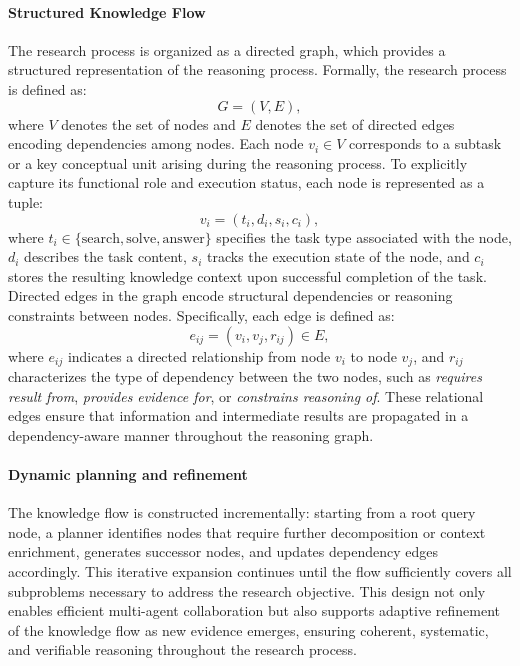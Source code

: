 \paragraph{Structured Knowledge Flow}
The research process is organized as a directed graph, which provides a structured
representation of the reasoning process. Formally, the research process is
defined as:
\begin{equation}
G = (V, E),
\end{equation}
where $V$ denotes the set of nodes and $E$ denotes the set of directed edges encoding
dependencies among nodes. Each node $v_i \in V$ corresponds to a subtask or a key conceptual unit arising during the reasoning process. To explicitly capture its functional role and execution status, each node is represented as a tuple:
\begin{equation}
v_i = (t_i, d_i, s_i, c_i),
\end{equation}
where $t_i \in \{\text{search}, \text{solve}, \text{answer}\}$ specifies the task type
associated with the node, $d_i$ describes the task content, $s_i$ tracks the execution
state of the node, and $c_i$ stores the resulting knowledge context upon successful
completion of the task. Directed edges in the graph encode structural dependencies or reasoning constraints between nodes. Specifically, each edge is defined as:
\begin{equation}
e_{ij} = (v_i, v_j, r_{ij}) \in E,
\end{equation}
where $e_{ij}$ indicates a directed relationship from node $v_i$ to node $v_j$, and $r_{ij}$
characterizes the type of dependency between the two nodes, such as \emph{requires
result from}, \emph{provides evidence for}, or \emph{constrains reasoning of}. These
relational edges ensure that information and intermediate results are propagated in a
dependency-aware manner throughout the reasoning graph.


\paragraph{Dynamic planning and refinement}
The knowledge flow is constructed incrementally: starting from a root query node, a planner identifies nodes that require further decomposition or context enrichment, generates successor nodes, and updates dependency edges accordingly. This iterative expansion continues until the flow sufficiently covers all subproblems necessary to address the research objective. This design not only enables efficient multi-agent collaboration but also supports adaptive refinement of the knowledge flow as new evidence emerges, ensuring coherent, systematic, and verifiable reasoning throughout the research process.

